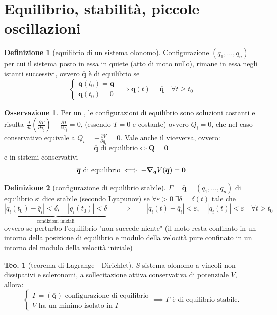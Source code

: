 \documentclass[a4paper,10pt]{article}
\theoremstyle{definition}
\newcommand{\bv}{\boldsymbol} %
\theoremstyle{indentdefinition}
\newtheorem{defn}{Definizione}[section]
\theoremstyle{indenttheorem}
\newtheorem{thm}{Teo.}
\theoremstyle{myremark}
\newtheorem*{rem*}{Osservazione}
\theoremstyle{indentgeneral}
\newenvironment{myboxed} 
{\noindent\begin{lrbox}{\mybox}\begin{minipage}{\textwidth}}
{\end{minipage}\end{lrbox}\fbox{\usebox{\mybox}}}
\begin{document}
\section{Equilibrio, stabilità, piccole oscillazioni}
\begin{defn}[equilibrio di un sistema olonomo]
\label{def:equilibrio-sistema-olonomo}Configurazione $\left(\overline{q_{1}},\dots,\overline{q_{n}}\right)$
per cui il sistema posto in essa in quiete (atto di moto nullo), rimane in essa negli istanti successivi, ovvero $\overline{\bv{q}}$ è di equilibrio se
$$\begin{cases}
    \bv{q}(t_0)=\overline{\bv{q}}\\
    \dot{\bv{q}}(t_0)=0
\end{cases}\implies   \bv{q}(t)=\overline{\bv{q}}\quad\forall t\ge t_0$$
\end{defn}

\begin{rem*}
Per un , le configurazioni
di equilibrio sono soluzioni costanti e risulta $\frac{d}{dt}\left(\frac{\partial T}{\partial\dot{q}_{j}}\right)-\frac{\partial T}{\partial q_{j}}=0$, (essendo $T=0$ e costante) ovvero $Q_{i}=0$, che nel caso conservativo equivale a $Q_{i}=-\frac{\partial V}{\partial q_{i}}=0$. Vale anche il viceversa, ovvero:
$$\overline{\bv{q}} \text{ di equilibrio}\iff \bv{Q}=\bv{0}$$
e in sistemi conservativi
$$\overline{\bv{q}} \text{ di equilibrio}\iff -\grad_{\bv{q}}V(\overline{\bv{q}})=\bv{0}$$
\end{rem*}
\begin{defn}[configurazione di equilibrio stabile]
\label{def:equilibrio-stabile}$\Gamma=\overline{\bv{q}}=\left(\overline{q}_{1},\dots,\overline{q}_{n}\right)$
di equilibrio si dice stabile (secondo Lyapunov) se $\forall\varepsilon>0\;\exists\delta=\delta\left(t\right)$
tale che
\[
\underbrace{\left|q_{i}\left(t_0\right)-\overline{q}_{i}\right|<\delta,\quad\left|\dot{q}_{i}\left(t_0\right)\right|<\delta}_{\text{condizioni iniziali}}\qquad\Longrightarrow\qquad\left|q_{i}\left(t\right)-\overline{q}_{i}\right|<\varepsilon,\quad\left|\dot{q}_{i}\left(t\right)\right|<\varepsilon\quad\forall t>t_0
\]
ovvero se perturbo l'equilibrio "non succede niente" (il moto resta confinato in un intorno della posizione di equilibrio e modulo della velocità pure confinato in un intorno del modulo della velocità iniziale)
\end{defn}

\begin{myboxed}
\begin{thm}[teorema di Lagrange - Dirichlet]
\label{thm:teorema-Lagrange-Dirichlet}$S$ sistema olonomo a vincoli
non dissipativi e scleronomi, a sollecitazione attiva conservativa
di potenziale $V$, allora:
$$\begin{cases}
    \Gamma=\left(\overline{\bv{q}}\right) \text{ configurazione di equilibrio} \\
     V \text{ ha un minimo isolato in $\Gamma$}
\end{cases} \implies \text{$\Gamma$ è di equilibrio
stabile.}$$
\end{thm}
\end{myboxed}
\end{document}
